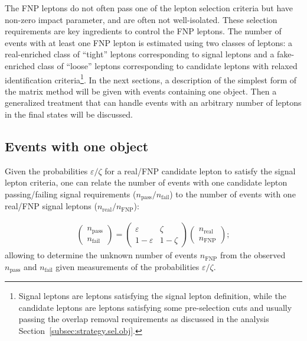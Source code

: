 The FNP leptons do not often pass one of the 
lepton selection criteria but have non-zero impact parameter, and are often not 
well-isolated. These selection requirements are key ingredients to control the FNP leptons. 
The number of events with at least one FNP lepton is estimated using two classes of leptons: 
a real-enriched class of ``tight'' leptons corresponding to signal leptons and a fake-enriched class of ``loose'' leptons 
corresponding to candidate leptons with relaxed identification criteria\footnote{Signal leptons are leptons satisfying the signal lepton definition, while the candidate leptons are leptons satisfying some pre-selection cuts and usually passing the overlap removal requirements as discussed in the analysis 
Section~\ref{subsec:strategy.sel.obj}.}. 
In the next sections, a description of the simplest form of the matrix method will be given with events containing one object. 
Then a generalized treatment that can handle events with an arbitrary number of leptons in the final states will be discussed.

\subsection{Events with one object}

Given the probabilities $\varepsilon/\zeta$ for a real/FNP candidate lepton to satisfy the signal lepton criteria, 
one can relate the number of events with one candidate lepton passing/failing signal requirements ($n_\text{pass}/n_\text{fail}$) to the number of events with one real/FNP signal leptons ($n_\text{real}/n_\text{FNP}$):

\begin{align}
\begin{pmatrix}n_\text{pass}\\n_\text{fail}\end{pmatrix} 
= \begin{pmatrix}\varepsilon & \zeta\\ 1-\varepsilon & 1-\zeta\end{pmatrix}
\begin{pmatrix}n_\text{real}\\n_\text{FNP}\end{pmatrix}; 
\label{eqn:matrix_method}
\end{align}
allowing to determine the unknown number of events $n_\text{FNP}$ from the observed $n_\text{pass}$ and $n_\text{fail}$ given measurements of the 
probabilities $\varepsilon/\zeta$. 

